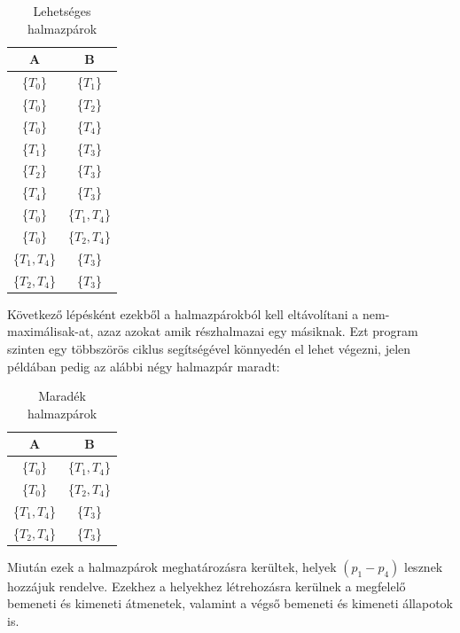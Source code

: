 \begin{example}
	\begin{table}[h]
	\begin{center}
	\caption{Lehetséges halmazpárok}
	\begin{tabular}{|| c | c ||}
		\hline
		A & B \\
		\hline\hline
		\{$T_0$\} & \{$T_1$\} \\
		\hline
		\{$T_0$\} & \{$T_2$\} \\
		\hline
		\{$T_0$\} & \{$T_4$\} \\
		\hline
		\{$T_1$\} & \{$T_3$\} \\
		\hline
		\{$T_2$\} & \{$T_3$\} \\
		\hline
		\{$T_4$\} & \{$T_3$\} \\
		\hline
		\{$T_0$\} & \{$T_1, T_4$\} \\
		\hline
		\{$T_0$\} & \{$T_2, T_4$\} \\
		\hline
		\{$T_1, T_4$\} & \{$T_3$\} \\
		\hline
		\{$T_2, T_4$\} & \{$T_3$\} \\
		\hline
	\end{tabular}
	\label{fig:planexample}
	\end{center}
	\end{table}	

	Következő lépésként ezekből a halmazpárokból kell eltávolítani a nem-maximálisak\hyp{}at, azaz azokat amik részhalmazai egy másiknak. Ezt program szinten egy többszörös ciklus segítségével könnyedén el lehet végezni, jelen példában pedig az alábbi négy halmazpár maradt:
	
	\begin{table}[h]
	\begin{center}
	\caption{Maradék halmazpárok}
	\begin{tabular}{|| c | c ||}
		\hline
		A & B \\
		\hline\hline
		\{$T_0$\} & \{$T_1, T_4$\} \\
		\hline
		\{$T_0$\} & \{$T_2, T_4$\} \\
		\hline
		\{$T_1, T_4$\} & \{$T_3$\} \\
		\hline
		\{$T_2, T_4$\} & \{$T_3$\} \\
		\hline
	\end{tabular}
	\label{fig:planexample}
	\end{center}
	\end{table}

	Miután ezek a halmazpárok meghatározásra kerültek, helyek $(p_1-p_4)$  lesznek hozzájuk rendelve. Ezekhez a helyekhez létrehozásra kerülnek a megfelelő bemeneti és kimeneti átmenetek, valamint a végső bemeneti és kimeneti állapotok is.


\end{example}
